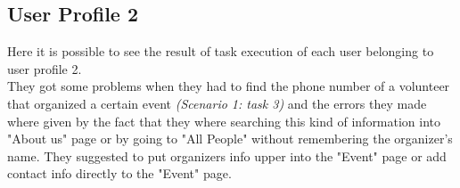 {\vspace{1cm}
}

\subsection{User Profile 2}
Here it is possible to see the result of task execution of each user belonging to user profile 2. \\ They got some problems when they had to find the phone number of a volunteer that organized a certain event \emph{(Scenario 1: task 3)} and the errors they made where given by the fact that they where searching this kind of information into "About us" page or by going to "All People" without remembering the organizer's name. They suggested to put organizers info upper into the "Event" page or add contact info directly to the "Event" page.

